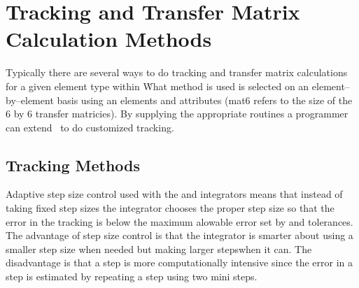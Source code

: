 \chapter{Tracking and Transfer Matrix Calculation Methods}

Typically there are several ways to do tracking and transfer matrix
calculations for a given element type within \bmad\. What method is used
is selected on an element--by--element basis using
an elements  and  attributes 
(mat6 refers to the size of the 6 by 6 transfer matricies). By supplying
the appropriate routines a programmer can extend \bmad\ to do customized 
tracking.

\section{Tracking Methods}
\label{s:tkm}

Adaptive step size control used with the  and
 integrators means that instead of taking fixed step sizes
the integrator chooses the proper step size so that the error in the
tracking is below the maximum alowable error set by  and
 tolerances. The advantage of step size control is that
the integrator is smarter about using a smaller step size when needed
but making larger stepswhen it can. The disadvantage is that a step is
more computationally intensive since the error in a step is estimated by
repeating a step using two mini steps.

